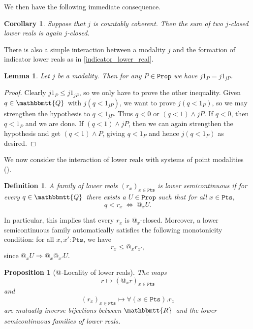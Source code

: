 \documentclass[reqno,11pt]{amsproc}
\makeatletter
\theoremstyle{plain}
\newtheorem{proposition}[theorem]{Proposition}
\newtheorem{corollary}[theorem]{Corollary}
\newtheorem{lemma}[theorem]{Lemma}
\newtheorem{definition}[theorem]{Definition}
\theoremstyle{definition}
\newcommand{\Const}[1]{\mathtt{#1}}
\newcommand{\ubar}[1]{\underaccent{\bar}{#1}}
\newcommand{\ind}[1]{1_{#1}}			%
\newcommand{\internal}[1]{\raisebox{-.03ex}{$\mathbbmtt{#1}$}}
\newcommand{\hs}{\hspace{1pt}}
\newcommand{\tqq}{\internal{Q}\hs}
\newcommand{\trr}{\internal{R}}
\newcommand{\tlrr}{\ubar{\trr}\hs}
\newcommand{\prop}{\Const{Prop}}
\newcommand{\pt}{x}
\newcommand{\pts}{\mathtt{Pts}}		%
\newcommand{\atsymbol}{{@}}
\newcommand{\at}[1][\pt]{\atsymbol_{#1}}
\newcommand{\imp}{\Rightarrow}
\newcommand{\beq}{\begin{equation}}
\newcommand{\eeq}{\end{equation}}
\numberwithin{equation}{section}
\makeatother
\begin{document}
We then have the following immediate consequence.

\begin{corollary}
	\label{closed_sum}
	Suppose that $j$ is countably coherent. Then the sum of two $j$-closed lower reals is again $j$-closed.
\end{corollary}

There is also a simple interaction between a modality $j$ and the formation of indicator lower reals as in \eqref{indicator_lower_real}.

\begin{lemma}
	\label{lemma.j_indicator}
	Let $j$ be a modality. Then for any $P \in \prop$ we have $j\ind{P}=j\ind{jP}$.
\end{lemma}

\begin{proof}
	Clearly $j\ind{P}\le j\ind{jP}$, so we only have to prove the other inequality. Given $q \in \tqq$ with $j(q < \ind{jP})$, we want to prove $j(q<\ind{P})$, so we may strengthen the hypothesis to $q < \ind{jP}$. Thus $q < 0$ or $(q < 1) \land jP$. If $q < 0$, then $q < \ind{P}$ and we are done. If $(q < 1) \land jP$, then we can again strengthen the hypothesis and get $(q<1)\wedge P$, giving $q<\ind{P}$ and hence $j(q<\ind{P})$ as desired.
\end{proof}

We now consider the interaction of lower reals with systems of point modalities ().

\begin{definition}
	A family of lower reals $(r_\pt)_{\pt \in \pts}$ is \emph{lower semicontinuous} if for every $q \in \tqq$ there exists a $U \in \prop$ such that for all $\pt \in \pts$,
	\beq
		\label{lsc_lr}
		q < r_\pt \: \Longleftrightarrow \: \at U.
	\eeq
\end{definition}

In particular, this implies that every $r_x$ is $\at$-closed. Moreover, a lower semicontinuous family automatically satisfies the following monotonicity condition: for all $\pt,\pt' : \pts$, we have
\begin{equation}
	\label{r_pt_monotone}
	r_\pt \le \at r_{\pt'},
\end{equation}
since $\at U \imp \at \at[\pt'] U$.

\begin{proposition}[{$\at[]$-Locality of lower reals}]
	\label{LR_locality}
	The maps
	\[
		r \longmapsto (\at r)_{\pt\in\pts}
	\]
	and
	\beq
		\label{lr_from_family}
		(r_\pt)_{\pt\in\pts} \longmapsto \forall(\pt \in \pts).r_\pt
	\eeq
	are mutually inverse bijections between $\tlrr$ and the lower semicontinuous families of lower reals.
\end{proposition}
\end{document}
